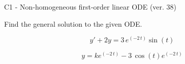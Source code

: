 \begin{exercise}
  \begin{exerciseTitle}C1 - Non-homogeneous first-order linear ODE (ver. 38)\end{exerciseTitle}
  \begin{exerciseStatement}
    
Find the general solution to the given ODE.

    
\[y'+2y= 3 \, e^{\left(-2 \, t\right)} \sin\left(t\right)\]

  \end{exerciseStatement}
  \begin{exerciseAnswer}
    
\[y= k e^{\left(-2 \, t\right)} - 3 \, \cos\left(t\right) e^{\left(-2 \, t\right)}\]

  \end{exerciseAnswer}
\end{exercise}
